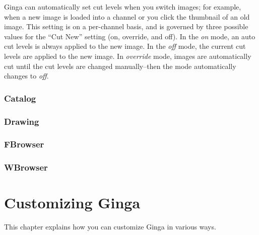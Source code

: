 \documentclass[11pt]{report}
\begin{document}
\label{pref:autocuts}
Ginga can automatically set cut levels when you switch images;
for example, when a new image is loaded into a channel or you click the
thumbnail of an old image.
This setting is on a per-channel basis, and is governed by three
possible values for the ``Cut New'' setting (on, override, and off).
In the \emph{on} mode, an auto cut levels is always applied to the
new image.  
In the \emph{off} mode, the current cut levels are applied to the new image.
In \emph{override} mode, images are automatically cut until the cut levels are
changed manually--then the mode automatically changes to \emph{off}.

\subsection{Catalog}
\subsection{Drawing}
\subsection{FBrowser}
\subsection{WBrowser}

\chapter{Customizing Ginga}
\label{ch:customizing}
This chapter explains how you can customize Ginga in various ways.
\end{document}
